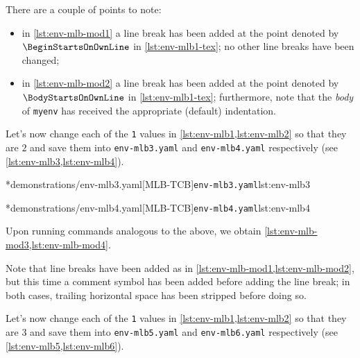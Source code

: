 	There are a couple of points to note: \begin{itemize} \item in \cref{lst:env-mlb-mod1} a line break has been added at the point denoted by $\BeginStartsOnOwnLine$ in \cref{lst:env-mlb1-tex}; no other line breaks have been changed;
		\item in \cref{lst:env-mlb-mod2} a line break has been added at the point denoted by $\BodyStartsOnOwnLine$ in \cref{lst:env-mlb1-tex}; furthermore, note that the \emph{body} of \texttt{myenv} has received the appropriate (default) indentation.
	\end{itemize}

	Let's now change each of the \texttt{1} values in \cref{lst:env-mlb1,lst:env-mlb2} so that they are $2$ and save them into \texttt{env-mlb3.yaml} and \texttt{env-mlb4.yaml} respectively (see \cref{lst:env-mlb3,lst:env-mlb4}).

	\begin{minipage}{.45\textwidth}
		\cmhlistingsfromfile[style=yaml-LST]*{demonstrations/env-mlb3.yaml}[MLB-TCB]{\texttt{env-mlb3.yaml}}{lst:env-mlb3}
	\end{minipage}
	\hfill
	\begin{minipage}{.45\textwidth}
		\cmhlistingsfromfile[style=yaml-LST]*{demonstrations/env-mlb4.yaml}[MLB-TCB]{\texttt{env-mlb4.yaml}}{lst:env-mlb4}
	\end{minipage}

	Upon running  commands analogous to the above, we obtain \cref{lst:env-mlb-mod3,lst:env-mlb-mod4}.

	\begin{widepage}
		\begin{minipage}{.56\linewidth}
		\end{minipage}
		\hfill
		\begin{minipage}{.43\linewidth}
		\end{minipage}
	\end{widepage}

	Note that line breaks have been added as in \cref{lst:env-mlb-mod1,lst:env-mlb-mod2}, but this time a comment symbol has been added before adding the line break; in both cases, trailing horizontal space has been stripped before doing so.

	Let's%
	  now change each of the \texttt{1} values in \cref{lst:env-mlb1,lst:env-mlb2} so that they are $3$ and save them into \texttt{env-mlb5.yaml} and \texttt{env-mlb6.yaml} respectively (see \cref{lst:env-mlb5,lst:env-mlb6}).

